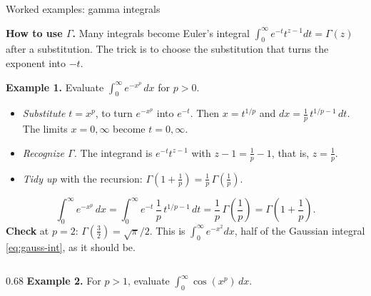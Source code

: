 \documentclass[11pt]{beamer}
\begin{document}
\begin{frame}[allowframebreaks=1.00]{Worked examples: gamma integrals}
\footnotesize

\textbf{How to use \(\Gamma\).} Many integrals become Euler's integral
\(\int_0^\infty e^{-t}t^{z-1}dt=\Gamma(z)\) after a substitution. The trick is to choose the
substitution that turns the exponent into \(-t\).

\textbf{Example 1.} Evaluate \(\int_0^\infty e^{-x^p}\,dx\) for \(p>0\).
\begin{itemize}
  \item \emph{Substitute} \(t=x^p\), to turn \(e^{-x^p}\) into \(e^{-t}\). Then \(x=t^{1/p}\) and
        \(dx=\frac1p\,t^{1/p-1}\,dt\). The limits \(x=0,\infty\) become \(t=0,\infty\).
  \item \emph{Recognize \(\Gamma\).} The integrand is \(e^{-t}t^{z-1}\) with \(z-1=\frac1p-1\), that is,
        \(z=\frac1p\).
  \item \emph{Tidy up} with the recursion: \(\Gamma(1+\frac1p)=\frac1p\,\Gamma(\frac1p)\).
\end{itemize}
\begin{equation}
  \int_0^\infty e^{-x^p}\,dx
   =\int_0^\infty e^{-t}\,\frac1p\,t^{1/p-1}\,dt
   =\frac1p\,\Gamma\left(\frac1p\right)
   =\Gamma\left(1+\frac1p\right).
  \label{eq:exp-xp}
\end{equation}
\textbf{Check} at \(p=2\): \(\Gamma(\tfrac32)=\sqrt\pi/2\). This is \(\int_0^\infty e^{-x^2}dx\),
half of the Gaussian integral \eqref{eq:gauss-int}, as it should be.
\par\framebreak\par
\begin{columns}[T]
\begin{column}{0.68\textwidth}
\textbf{Example 2.} For \(p>1\), evaluate \(\int_0^\infty\cos(x^p)\,dx\).


\end{column}
\end{columns}
\end{frame}
\end{document}
